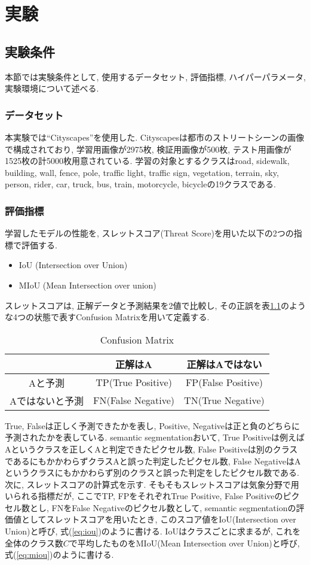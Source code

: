 \chapter{実験} \label{sec_experience}

\section{実験条件}
  本節では実験条件として, 使用するデータセット, 評価指標, ハイパーパラメータ, 実験環境について述べる. 
\subsection{データセット}
本実験では``Cityscapes''\cite{cityscapes}を使用した. Cityscapesは都市のストリートシーンの画像で構成されており, 学習用画像が2975枚, 検証用画像が500枚, テスト用画像が1525枚の計5000枚用意されている. 学習の対象とするクラスはroad, sidewalk, building, wall, fence, pole, traffic light, traffic sign, vegetation, terrain, sky, person, rider, car, truck, bus, train, motorcycle, bicycleの19クラスである. 

\subsection{評価指標}
学習したモデルの性能を, スレットスコア(Threat Score)を用いた以下の2つの指標で評価する.
\begin{itemize}
\item IoU (Intersection over Union)
\item MIoU (Mean Intersection over union)
\end{itemize}
スレットスコアは, 正解データと予測結果を2値で比較し, その正誤を表\ref{tab:hixyouka}のような4つの状態で表すConfusion Matrixを用いて定義する.
\begin{table}[H]
  \centering
  \caption{Confusion Matrix}
  \begin{tabular}{c|c|c}\hline \hline
     & 正解はA & 正解はAではない \\ \hline 
    Aと予測 & TP(True Positive) & FP(False Positive) \\ \hline
    Aではないと予測 & FN(False Negative) & TN(True Negative) \\ \hline \hline
  \end{tabular}
  \label{tab:hixyouka}
\end{table}
True, Falseは正しく予測できたかを表し, Positive, Negativeは正と負のどちらに予測されたかを表している. semantic segmentationおいて, True Positiveは例えばAというクラスを正しくAと判定できたピクセル数, False Positiveは別のクラスであるにもかかわらずクラスAと誤った判定したピクセル数, False NegativeはAというクラスにもかかわらず別のクラスと誤った判定をしたピクセル数である. \\
次に, スレットスコアの計算式を示す. そもそもスレットスコアは気象分野で用いられる指標だが, ここでTP, FPをそれぞれTrue Positive, False Positiveのピクセル数とし, FNをFalse Negativeのピクセル数として, semantic segmentationの評価値としてスレットスコアを用いたとき, このスコア値をIoU(Intersection over Union)と呼び, 式(\ref{eq:iou})のように書ける. IoUはクラスごとに求まるが, これを全体のクラス数$C$で平均したものをMIoU(Mean Intersection over Union)と呼び, 式(\ref{eq:miou})のように書ける.

